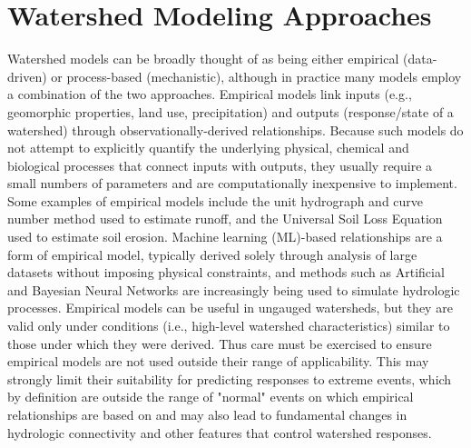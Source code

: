 \documentclass[preprint,review, 12pt]{elsarticle}
\begin{document}
\section{Watershed Modeling Approaches}


Watershed models can be broadly thought of as being either empirical (data-driven) or  process-based (mechanistic), although in practice many models employ a combination of the two approaches. Empirical models link inputs (e.g., geomorphic properties, land use, precipitation) and outputs (response/state of a watershed) through observationally-derived relationships. Because such models do not attempt to explicitly quantify the underlying physical, chemical and biological processes that connect inputs with outputs, they usually require a small numbers of parameters and are computationally inexpensive to implement. Some examples of empirical models include the unit hydrograph and curve number method \citep{USDA1986} used to estimate runoff, and the Universal Soil Loss Equation \citep{Hudson1993} used to estimate soil erosion. Machine learning (ML)-based relationships are a form of empirical model, typically derived solely through analysis of large datasets without imposing physical constraints, and methods such as Artificial and Bayesian Neural Networks \citep{Committee2000, Dawson2001, Dawson1998, Dwivedi2013} are increasingly being used to simulate hydrologic processes. Empirical models can be useful in ungauged watersheds, but they are valid only under conditions (i.e., high-level watershed characteristics) similar to those under which they were derived. Thus care must be exercised to ensure empirical models are not used outside their range of applicability. This may strongly limit their suitability for predicting responses to extreme events, which by definition are outside the range of "normal" events on which empirical relationships are based on and may also lead to fundamental changes in hydrologic connectivity and other features that control watershed responses.
\end{document}
